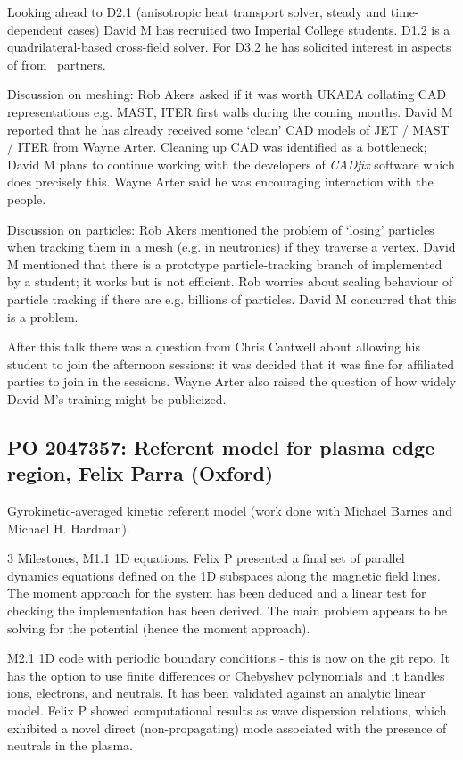 Looking ahead to D2.1 (anisotropic heat transport solver, steady and 
time-dependent cases) David M has recruited two Imperial College students.  
D1.2 is a quadrilateral-based cross-field solver.  For D3.2 he has solicited 
interest in aspects of  from \nep\ partners.


Discussion on meshing: Rob Akers asked if it was worth UKAEA collating CAD 
representations e.g. MAST, ITER first walls during the coming months.  David M 
reported that he has already received some `clean' CAD models of JET / MAST / 
ITER from Wayne Arter.  Cleaning up CAD was identified as a bottleneck; David M 
plans to continue working with the developers of {\it CADfix} software which 
does precisely this.  Wayne Arter said he was encouraging interaction with
the  people.

Discussion on particles: Rob Akers mentioned the problem of `losing' particles 
when tracking them in a mesh (e.g. in neutronics) if they traverse a vertex.  
David M mentioned that there is a prototype particle-tracking branch of 
implemented by a student; it works but is not efficient.  Rob worries 
about scaling behaviour of particle tracking if there are e.g. billions of 
particles.  David M concurred that this is a problem.

After this talk there was a question from Chris Cantwell about allowing 
his student to join the afternoon sessions: it was decided that it was fine for 
affiliated parties to join in the sessions.  Wayne Arter also raised the 
question of how widely David M's  training might be publicized.

\subsection{PO 2047357: Referent model for plasma edge region, Felix Parra (Oxford)}

Gyrokinetic-averaged kinetic referent model (work done with Michael Barnes and 
Michael H. Hardman).

3 Milestones, M1.1 1D equations.  Felix P presented a final set of parallel 
dynamics equations defined on the 1D subspaces along the magnetic field lines.  
The moment approach for the system has been deduced and a linear test for 
checking the implementation has been derived.  The main problem appears to be 
solving for the potential (hence the moment approach).

M2.1 1D code with periodic boundary conditions - this is now on the git repo.  
It has the option to use finite differences or Chebyshev polynomials and it 
handles ions, electrons, and neutrals.  It has been validated against an 
analytic linear model.  Felix P showed computational  results as
wave dispersion relations, which exhibited a novel direct (non-propagating)  mode associated 
with the presence of neutrals  in the plasma.

